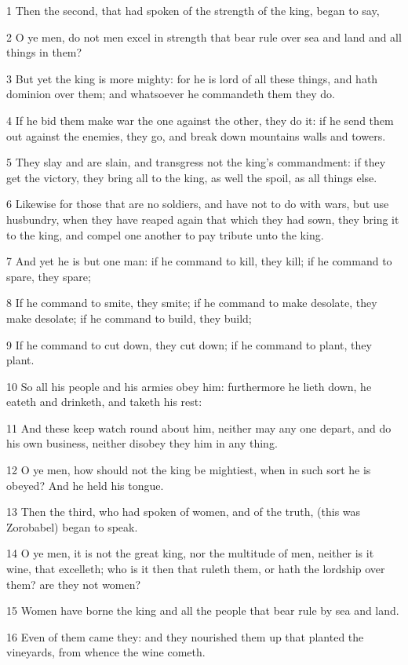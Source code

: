 \par 1 Then the second, that had spoken of the strength of the king, began to say,
\par 2 O ye men, do not men excel in strength that bear rule over sea and land and all things in them?
\par 3 But yet the king is more mighty: for he is lord of all these things, and hath dominion over them; and whatsoever he commandeth them they do.
\par 4 If he bid them make war the one against the other, they do it: if he send them out against the enemies, they go, and break down mountains walls and towers.
\par 5 They slay and are slain, and transgress not the king's commandment: if they get the victory, they bring all to the king, as well the spoil, as all things else.
\par 6 Likewise for those that are no soldiers, and have not to do with wars, but use husbundry, when they have reaped again that which they had sown, they bring it to the king, and compel one another to pay tribute unto the king.
\par 7 And yet he is but one man: if he command to kill, they kill; if he command to spare, they spare;
\par 8 If he command to smite, they smite; if he command to make desolate, they make desolate; if he command to build, they build;
\par 9 If he command to cut down, they cut down; if he command to plant, they plant.
\par 10 So all his people and his armies obey him: furthermore he lieth down, he eateth and drinketh, and taketh his rest:
\par 11 And these keep watch round about him, neither may any one depart, and do his own business, neither disobey they him in any thing.
\par 12 O ye men, how should not the king be mightiest, when in such sort he is obeyed? And he held his tongue.
\par 13 Then the third, who had spoken of women, and of the truth, (this was Zorobabel) began to speak.
\par 14 O ye men, it is not the great king, nor the multitude of men, neither is it wine, that excelleth; who is it then that ruleth them, or hath the lordship over them? are they not women?
\par 15 Women have borne the king and all the people that bear rule by sea and land.
\par 16 Even of them came they: and they nourished them up that planted the vineyards, from whence the wine cometh.
